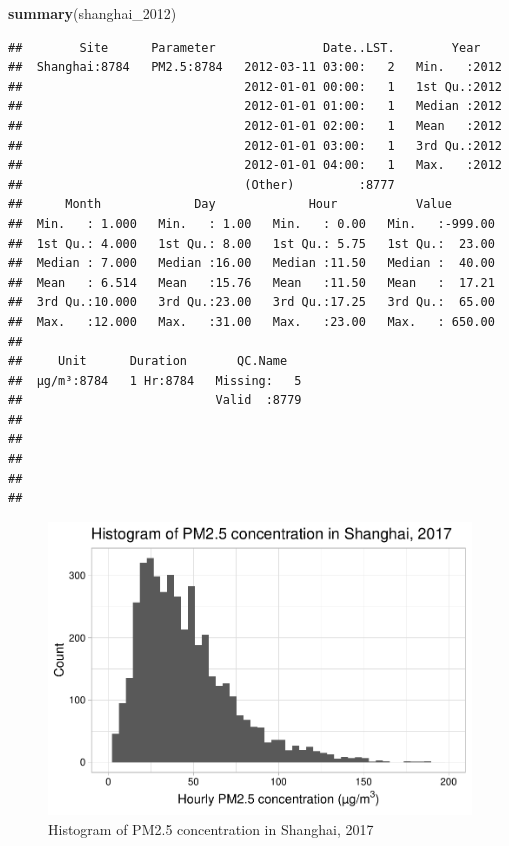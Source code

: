 \documentclass[12pt,]{article}
\newenvironment{Shaded}{\begin{snugshade}}{\end{snugshade}}
\newcommand{\KeywordTok}[1]{\textcolor[rgb]{0.13,0.29,0.53}{\textbf{#1}}}
\newcommand{\DecValTok}[1]{\textcolor[rgb]{0.00,0.00,0.81}{#1}}
\newcommand{\NormalTok}[1]{#1}
\begin{document}
\begin{Shaded}
\begin{Highlighting}[]
\KeywordTok{summary}\NormalTok{(shanghai_}\DecValTok{2012}\NormalTok{)}
\end{Highlighting}
\end{Shaded}

\begin{verbatim}
##        Site      Parameter               Date..LST.        Year     
##  Shanghai:8784   PM2.5:8784   2012-03-11 03:00:   2   Min.   :2012  
##                               2012-01-01 00:00:   1   1st Qu.:2012  
##                               2012-01-01 01:00:   1   Median :2012  
##                               2012-01-01 02:00:   1   Mean   :2012  
##                               2012-01-01 03:00:   1   3rd Qu.:2012  
##                               2012-01-01 04:00:   1   Max.   :2012  
##                               (Other)         :8777                 
##      Month             Day             Hour           Value        
##  Min.   : 1.000   Min.   : 1.00   Min.   : 0.00   Min.   :-999.00  
##  1st Qu.: 4.000   1st Qu.: 8.00   1st Qu.: 5.75   1st Qu.:  23.00  
##  Median : 7.000   Median :16.00   Median :11.50   Median :  40.00  
##  Mean   : 6.514   Mean   :15.76   Mean   :11.50   Mean   :  17.21  
##  3rd Qu.:10.000   3rd Qu.:23.00   3rd Qu.:17.25   3rd Qu.:  65.00  
##  Max.   :12.000   Max.   :31.00   Max.   :23.00   Max.   : 650.00  
##                                                                    
##     Unit      Duration       QC.Name    
##  µg/m³:8784   1 Hr:8784   Missing:   5  
##                           Valid  :8779  
##                                         
##                                         
##                                         
##                                         
## 
\end{verbatim}

\begin{figure}
\centering
\includegraphics{Project_Template_files/figure-latex/Exploratory graph 1-1.pdf}
\caption{Histogram of PM2.5 concentration in Shanghai, 2017}
\end{figure}
\end{document}
